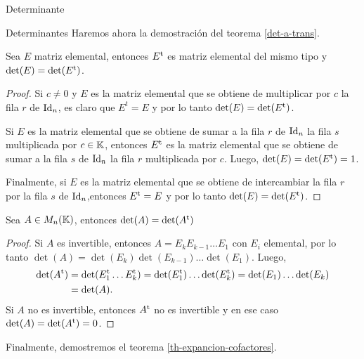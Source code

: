 \begin{chapter}{Determinante}
\begin{section}{Determinantes}
        Haremos ahora la demostración del teorema \ref{det-a-trans}. 

        \begin{teorema}
            Sea $E$ matriz elemental, entonces $E^{\operatorname{t}}$ es matriz elemental del mismo tipo y $\det(E) = \det(E^{\operatorname{t}})$.
        \end{teorema}
        \begin{proof}
            Si $c \not=0$ y $E$ es la matriz elemental que se obtiene de multiplicar por  $c$ la fila $r$ de $\operatorname{Id}_n$, es claro que $E^t = E$ y por lo tanto 	$\det(E) = \det(E^{\operatorname{t}})$.
            
            Si $E$ es la matriz elemental que se obtiene de sumar a la fila $r$ de $\operatorname{Id}_n$ la fila $s$ multiplicada por $c \in \mathbb K$,  entonces  $E^{\operatorname{t}}$  es la matriz elemental que se obtiene de sumar a la fila $s$ de $\operatorname{Id}_n$ la fila $r$ multiplicada por $c$. Luego,   $\det(E) = \det(E^{\operatorname{t}}) = 1$.
            
            Finalmente, si $E$ es la  matriz elemental que se obtiene de intercambiar la fila $r$ por la fila $s$ de $\operatorname{Id}_n$,entonces $E^{\operatorname{t}} = E$ y por lo tanto $\det(E) = \det(E^{\operatorname{t}})$.
        \end{proof}

        \begin{teorema}\label{th-det-a-trans-app} 
            Sea $A \in M_n(\mathbb K)$,  entonces 
            $\det(A) = \det(A^{\operatorname{t}})$
        \end{teorema}
        \begin{proof}
            Si $A$ es invertible, entonces  $A = E_kE_{k-1}\ldots E_1$ con $E_i$ elemental, por lo tanto $\det(A) = \det( E_k)\det(E_{k-1})\ldots \det(E_1)$. Luego,
            \begin{align*}
            \det(A^{\operatorname{t}}) &= \det(E_1^{\operatorname{t}} \ldots E_k^{\operatorname{t}}) = \det(E_1^{\operatorname{t}}) \ldots \det(E_k^{\operatorname{t}}) = 
            \det(E_1) \ldots \det(E_k) \\&= \det(A).
            \end{align*}
            Si $A$ no es invertible, entonces $A^{\operatorname{t}}$ no es invertible y en ese caso $\det(A) = \det(A^{\operatorname{t}})=0$.
        \end{proof}
        
        Finalmente,  demostremos el teorema \ref{th-expancion-cofactores}.
    

\end{section}
\end{chapter}
